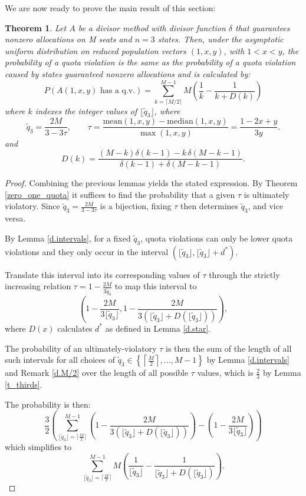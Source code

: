 \documentclass[11pt]{article}
\newtheorem{theorem}{Theorem}[section]
\theoremstyle{definition}
\theoremstyle{definition}
\begin{document}
\noindent We are now ready to prove the main result of this section: 
\begin{theorem}\label{prob_sum} Let $A$ be a divisor method with divisor function $\delta$ that guarantees nonzero allocations on M seats and $n = 3$ states. Then, under the asymptotic uniform distribution on reduced population vectors $(1, x, y)$, with $1<x<y$,  the probability of a quota violation is the same as the probability of a quota violation caused by states guaranteed nonzero allocations and is calculated by:
$$P(A(1,x,y) \text { has a q.v.}) = \sum_{k = \lceil M/2 \rceil}^{M-1} M\left( \frac{1}{k} - \frac{1}{k + D(k)} \right)$$
where $k$ indexes the integer values of $\lfloor \tilde{q}_3 \rfloor$, where 
$$\tilde{q}_3 = \frac{2M}{3-3\tau}, \qquad \tau = \frac{\mathrm{mean}(1,x,y)-\mathrm{median}(1,x,y)}{\max(1,x,y)}=\dfrac{1 - 2x + y}{3y}.$$ and 
$$D(k) =\frac{(M-k)\delta(k-1)-k\,\delta(M-k-1)}{\delta(k-1)+\delta(M-k-1)}.$$
\end{theorem}

\begin{proof}
Combining the previous lemmas yields the stated expression. By Theorem \ref{zero_one_quota} it suffices to find the probability that a given $\tau$ is ultimately violatory. Since $\tilde{q}_3 = \frac{2M}{3-3\tau}$ is a bijection, fixing $\tau$ then determines $\tilde{q}_3$, and vice versa.

By Lemma \ref{d.intervals}, for a fixed $\tilde{q}_3$, quota violations can only be lower quota violations and they only occur in the interval $(\lfloor \tilde{q}_3 \rfloor, \lfloor \tilde{q}_3 \rfloor + d^*)$. 

Translate this interval into its corresponding values of $\tau$ through the strictly increasing relation $\tau = 1 - \frac{2M}{3\tilde{q}_3}$ to map this interval to $$(1 - \frac{2M}{3\lfloor \tilde{q}_3 \rfloor}, 1-\frac{2M}{3(\lfloor \tilde{q}_3 \rfloor+D(\lfloor \tilde{q}_3 \rfloor))}),$$ where $D(x)$ calculates $d^*$ as defined in Lemma \ref{d.star}. 

The probability of an ultimately-violatory $\tau$ is then the sum of the length of all such intervals for all choices of $\tilde{q}_3 \in \left\{ \left\lceil \frac{M}{2} \right\rceil, \dots, M-1 \right\}$ by Lemma \ref{d.intervals} and Remark \ref{d.M/2} over the length of all possible $\tau$ values, which is $\frac{2}{3}$ by Lemma \ref{t_thirds}. 

The probability is then:
$$\frac{3}{2} \left( \sum_{\lfloor \tilde{q}_3 \rfloor= \lceil \frac{M}{2} \rceil}^{M-1} \left(1-\frac{2M}{3(\lfloor \tilde{q}_3 \rfloor+D(\lfloor \tilde{q}_3 \rfloor))}\right)- \left(1 - \frac{2M}{3\lfloor \tilde{q}_3 \rfloor}\right)\right)$$ 
which simplifies to $$\sum_{\lfloor \tilde{q}_3 \rfloor= \lceil \frac{M}{2} \rceil}^{M-1} M\left( \frac{1}{\lfloor \tilde{q}_3 \rfloor} - \frac{1}{\lfloor \tilde{q}_3 \rfloor + D(\lfloor \tilde{q}_3 \rfloor)} \right).$$
\end{proof}
\end{document}
